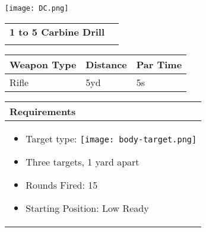 \documentclass[../Cover.tex]{subfiles}
\begin{document}
	\begin{minipage}[t][0.2\textheight][t]{0.1\textwidth} 
		\texttt{[image: DC.png]}
	\end{minipage}
	\hfill
	\begin{minipage}[t][0.2\textheight][t]{0.8\textwidth}
		\begin{tabular}{ p{} l  }		
			\\	
			\small \textbf{1 to 5 Carbine Drill} \\
			\\[0.09\textheight]
		\end{tabular}
		\quad
		\begin{tabular}{ | p{} | p{} | p{} |}
			\hline
			\rowcolor[HTML]{C0C0C0}\tiny Weapon Type & \tiny Distance & \tiny Par Time\\ 
			\hline
			\tiny Rifle & \tiny 5yd & \tiny 5s \\ %
			\hline
		\end{tabular}
	\end{minipage}
	\begin{tabular}{p{}}
		\small Requirements \\
		\hline
		\tiny \begin{itemize} %
			\item Target type: \texttt{[image: body-target.png]}
			\item Three targets, 1 yard apart
			\item Rounds Fired: 15
			\item Starting Position: Low Ready
		\end{itemize}
		
		
		
		\\[0.6\textheight]
	\end{tabular}
\end{document}
